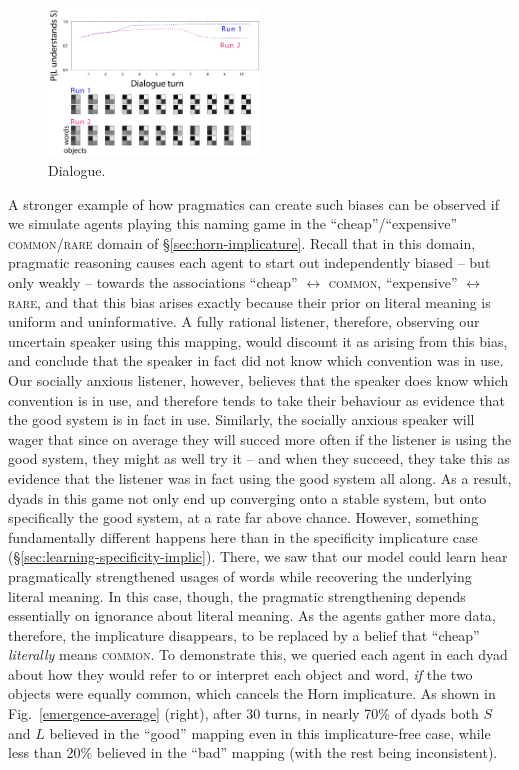\documentclass{article} %
\begin{document}
\begin{figure}
\centering
\includegraphics[width=0.5\textwidth]{figures/horn-composite.pdf}
\caption{\label{fig:horn} Dialogue.}
\end{figure}

A stronger example of how pragmatics can create such biases can be observed if we simulate agents playing this naming game in the ``cheap''/``expensive'' \textsc{common}/\textsc{rare} domain of \S\ref{sec:horn-implicature}. Recall that in this domain, pragmatic reasoning causes each agent to start out independently biased -- but only weakly -- towards the associations ``cheap'' $\leftrightarrow$ \textsc{common}, ``expensive'' $\leftrightarrow$ \textsc{rare}, and that this bias arises exactly because their prior on literal meaning is uniform and uninformative. A fully rational listener, therefore, observing our uncertain speaker using this mapping, would discount it as arising from this bias, and conclude that the speaker in fact did not know which convention was in use. Our socially anxious listener, however, believes that the speaker does know which convention is in use, and therefore tends to take their behaviour as evidence that the good system is in fact in use. Similarly, the socially anxious speaker will wager that since on average they will succed more often if the listener is using the good system, they might as well try it -- and when they succeed, they take this as evidence that the listener was in fact using the good system all along. As a result, dyads in this game not only end up converging onto a stable system, but onto specifically the good system, at a rate far above chance. However, something fundamentally different happens here than in the specificity implicature case (\S\ref{sec:learning-specificity-implic}). There, we saw that our model could learn hear pragmatically strengthened usages of words while recovering the underlying literal meaning. In this case, though, the pragmatic strengthening depends essentially on ignorance about literal meaning. As the agents gather more data, therefore, the implicature disappears, to be replaced by a belief that ``cheap'' \textit{literally} means \textsc{common}. To demonstrate this, we queried each agent in each dyad about how they would refer to or interpret each object and word, \textit{if} the two objects were equally common, which cancels the Horn implicature. As shown in Fig.~\ref{emergence-average} (right), after 30 turns, in nearly 70\% of dyads both $S$ and $L$ believed in the ``good'' mapping even in this implicature-free case, while less than 20\% believed in the ``bad'' mapping (with the rest being inconsistent).
\end{document}
